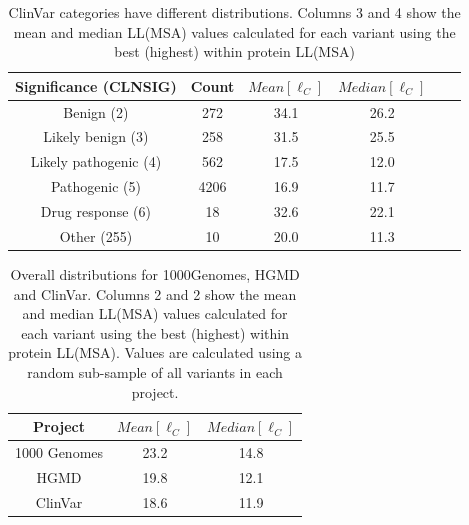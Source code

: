 \begin{table}[ht]
\begin{tabular}{|c|c|c|c|c|c|}
\hline 
Significance (CLNSIG)   &   Count  & $Mean[\ell_C]$  &  $Median[\ell_C]$ \\
\hline 
Benign (2)              &    272   &      34.1       &    26.2     \\
Likely benign (3)       &    258   &      31.5       &    25.5     \\
Likely pathogenic (4)   &    562   &      17.5       &    12.0     \\
Pathogenic (5)          &   4206   &      16.9       &    11.7     \\
Drug response (6)       &     18   &      32.6       &    22.1     \\
Other (255)             &     10   &      20.0       &    11.3     \\
\hline 
\end{tabular}
\caption{ClinVar categories have different distributions. Columns 3 and 4 show the mean and median LL(MSA) values calculated for each variant using the best (highest) within protein LL(MSA)} 
\label{tab:gwas_clinvar}
\end{table}

\begin{table}[ht]
\begin{tabular}{|c|c|c|}
\hline 
Project      & $Mean[\ell_C]$  &  $Median[\ell_C]$ \\
\hline 
1000 Genomes &            23.2 &          14.8  \\
HGMD         &            19.8 &          12.1  \\
ClinVar      &            18.6 &          11.9  \\
\hline 
\end{tabular} 
\caption{Overall distributions for 1000Genomes, HGMD and ClinVar. Columns 2 and 2 show the mean and median LL(MSA) values calculated for each variant using the best (highest) within protein LL(MSA). Values are calculated using a random sub-sample of all variants in each project.}
\label{tab:gwas_1Kg}
\end{table}
